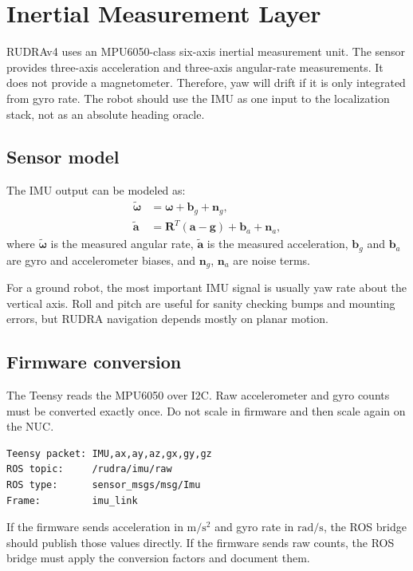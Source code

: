 
\chapter{Inertial Measurement Layer}
\label{chap:mpu6050}

RUDRAv4 uses an MPU6050-class six-axis inertial measurement unit.  The sensor provides three-axis acceleration and three-axis angular-rate measurements.  It does not provide a magnetometer.  Therefore, yaw will drift if it is only integrated from gyro rate.  The robot should use the IMU as one input to the localization stack, not as an absolute heading oracle.

\section{Sensor model}
The IMU output can be modeled as:
\begin{align}
\tilde{\boldsymbol{\omega}} &= \boldsymbol{\omega} + \boldsymbol{b}_{g} + \boldsymbol{n}_{g}, \\
\tilde{\boldsymbol{a}} &= \mathbf{R}^{T}(\boldsymbol{a}-\boldsymbol{g}) + \boldsymbol{b}_{a} + \boldsymbol{n}_{a},
\end{align}
where \(\tilde{\boldsymbol{\omega}}\) is the measured angular rate, \(\tilde{\boldsymbol{a}}\) is the measured acceleration, \(\boldsymbol{b}_{g}\) and \(\boldsymbol{b}_{a}\) are gyro and accelerometer biases, and \(\boldsymbol{n}_{g}\), \(\boldsymbol{n}_{a}\) are noise terms.

For a ground robot, the most important IMU signal is usually yaw rate about the vertical axis.  Roll and pitch are useful for sanity checking bumps and mounting errors, but RUDRA navigation depends mostly on planar motion.

\section{Firmware conversion}
The Teensy reads the MPU6050 over I2C.  Raw accelerometer and gyro counts must be converted exactly once.  Do not scale in firmware and then scale again on the NUC.

\begin{lstlisting}[caption={Current ROS topic contract for IMU telemetry.}]
Teensy packet: IMU,ax,ay,az,gx,gy,gz
ROS topic:     /rudra/imu/raw
ROS type:      sensor_msgs/msg/Imu
Frame:         imu_link
\end{lstlisting}

If the firmware sends acceleration in \(\mathrm{m/s^2}\) and gyro rate in \(\mathrm{rad/s}\), the ROS bridge should publish those values directly.  If the firmware sends raw counts, the ROS bridge must apply the conversion factors and document them.

